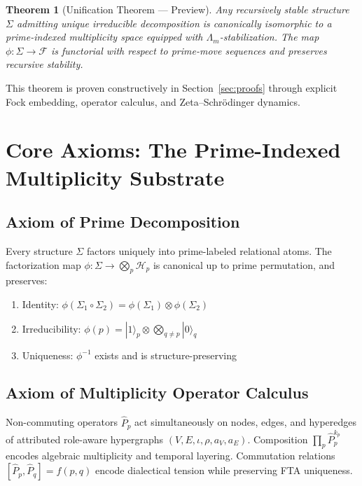 \documentclass[12pt]{amsart}
\theoremstyle{plain}
\newtheorem{theorem}{Theorem}[section]
\begin{document}
\begin{theorem}[Unification Theorem --- Preview]\label{thm:unification}
Any recursively stable structure \(\Sigma\) admitting unique irreducible decomposition is canonically isomorphic to a prime-indexed multiplicity space equipped with \(\Lambda_m\)-stabilization. The map \(\phi: \Sigma \to \mathcal{F}\) is functorial with respect to prime-move sequences and preserves recursive stability.
\end{theorem}

This theorem is proven constructively in Section~\ref{sec:proofs} through explicit Fock embedding, operator calculus, and Zeta--Schr\"odinger dynamics.

\section{Core Axioms: The Prime-Indexed Multiplicity Substrate}

\subsection{Axiom of Prime Decomposition}

\begin{axiom}\label{ax:fta}
Every structure \(\Sigma\) factors uniquely into prime-labeled relational atoms. The factorization map \(\phi: \Sigma \to \bigotimes_p \mathcal{H}_p\) is canonical up to prime permutation, and preserves:
\begin{enumerate}[label=(\roman*)]
\item Identity: \(\phi(\Sigma_1 \circ \Sigma_2) = \phi(\Sigma_1) \otimes \phi(\Sigma_2)\)
\item Irreducibility: \(\phi(p) = |1\rangle_p \otimes \bigotimes_{q \neq p} |0\rangle_q\)
\item Uniqueness: \(\phi^{-1}\) exists and is structure-preserving
\end{enumerate}
\end{axiom}

\subsection{Axiom of Multiplicity Operator Calculus}

\begin{axiom}\label{ax:moc}
Non-commuting operators \(\hat{P}_p\) act simultaneously on nodes, edges, and hyperedges of attributed role-aware hypergraphs \((V, E, \iota, \rho, a_V, a_E)\). Composition \(\prod_p \hat{P}_p^{k_p}\) encodes algebraic multiplicity and temporal layering. Commutation relations \([\hat{P}_p, \hat{P}_q] = f(p,q)\) encode dialectical tension while preserving FTA uniqueness.
\end{axiom}
\end{document}
